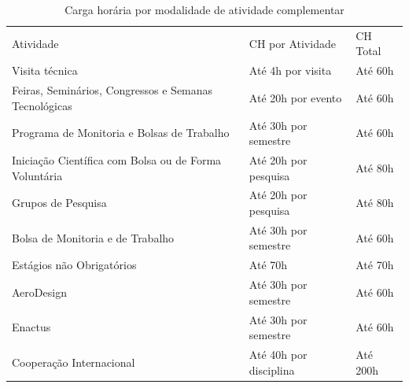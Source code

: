 \documentclass{paper}
\begin{document}
\begin{longtable}{|p{8.5cm}|p{3.5cm}|p{2cm}|}

\caption{Carga horária por modalidade de atividade complementar}\label{tab12} 

\vspace{-0.25cm}


\\ \hline 

 \cellcolor{\cinza}Atividade & \cellcolor{\cinza}CH por Atividade & \cellcolor{\cinza}CH Total \\ 
 
 \hline

 Visita técnica & Até 4h por visita & Até 60h \\ 

 \hline 
 
 Feiras, Seminários, Congressos e Semanas Tecnológicas & Até 20h por evento & Até 60h \\
 
 \hline
 
 Programa de Monitoria e Bolsas de Trabalho & Até 30h por semestre & Até 60h \\
 
 \hline
 
 Iniciação Científica com Bolsa ou de Forma Voluntária & Até 20h por pesquisa & Até 80h \\
 
 \hline
 
 Grupos de Pesquisa & Até 20h por pesquisa & Até 80h \\
 
 \hline
 
 Bolsa de Monitoria e de Trabalho & Até 30h por semestre & Até 60h \\
 
 \hline
 
 Estágios não Obrigatórios & Até 70h & Até 70h \\
 
 \hline
 
 AeroDesign & Até 30h por semestre & Até 60h \\ 
 
 \hline
 
 Enactus & Até 30h por semestre & Até 60h \\
 
 \hline
 
 Cooperação Internacional & Até 40h por disciplina & Até 200h\\
 

\end{longtable}
\end{document}
